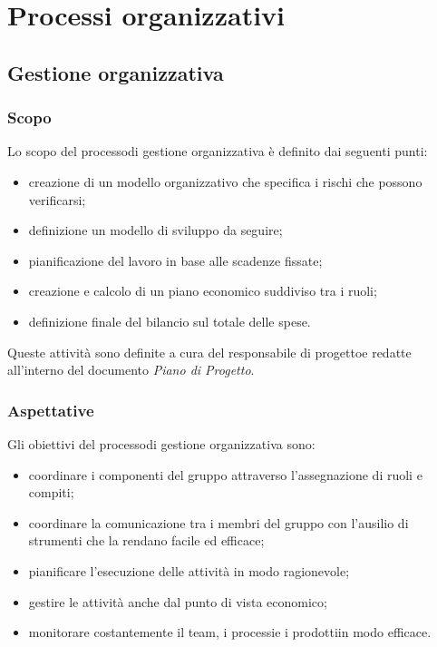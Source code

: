 \section{Processi organizzativi}
	\subsection{Gestione organizzativa}
		\subsubsection{Scopo}
			Lo scopo del processo\glosp di gestione organizzativa è definito dai seguenti punti:
			\begin{itemize}
				\item creazione di un modello organizzativo che specifica i rischi che possono verificarsi;
				\item definizione un modello di sviluppo da seguire;
				\item pianificazione del lavoro in base alle scadenze fissate;
				\item creazione e calcolo di un piano economico suddiviso tra i ruoli;
				\item definizione finale del bilancio sul totale delle spese.
			\end{itemize}
			Queste attività sono definite a cura del responsabile di progetto\glosp e redatte all'interno del documento \textit{Piano di Progetto}.
		\subsubsection{Aspettative}
			Gli obiettivi del processo\glosp di gestione organizzativa sono:
			\begin{itemize}
				\item coordinare i componenti del gruppo attraverso l'assegnazione di ruoli e compiti;
				\item coordinare la comunicazione tra i membri del gruppo con l'ausilio di strumenti che la rendano facile ed efficace;
				\item pianificare l'esecuzione delle attività in modo ragionevole;
				\item gestire le attività anche dal punto di vista economico;
				\item monitorare costantemente il team, i processi\glosp e i prodotti\glosp in modo efficace.
			\end{itemize}
